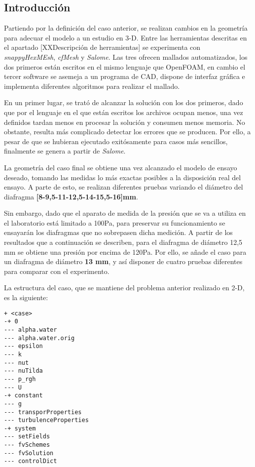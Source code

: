 \subsection{Introducción}\label{header-n2}

Partiendo por la definición del caso anterior, se realizan cambios en la
geometría para adecuar el modelo a un estudio en 3-D. Entre las
herramientas descritas en el apartado {[}XXDescripción de
herramientas{]} se experimenta con \emph{snappyHexMEsh}, \emph{cfMesh} y
\emph{Salome}. Las tres ofrecen mallados automatizados, los dos primeros
están escritos en el mismo lenguaje que OpenFOAM, en cambio el tercer
software se asemeja a un programa de CAD, dispone de interfaz gráfica e
implementa diferentes algoritmos para realizar el mallado.

En un primer lugar, se trató de alcanzar la solución con los dos
primeros, dado que por el lenguaje en el que están escritos los archivos
ocupan menos, una vez definidos tardan menos en procesar la solución y
consumen menos memoria. No obstante, resulta más complicado detectar los
errores que se producen. Por ello, a pesar de que se hubieran ejecutado
exitósamente para casos más sencillos, finalmente se genera a partir de
\emph{Salome}.

La geometría del caso final se obtiene una vez alcanzado el modelo de
ensayo deseado, tomando las medidas lo más exactas posibles a la
disposición real del ensayo. A parte de esto, se realizan diferentes
pruebas variando el diámetro del diafragma
\textbf{{[}8-9,5-11-12,5-14-15,5-16{]}mm}.

Sin embargo, dado que el aparato de medida de la presión que se va a
utiliza en el laboratorio está limitado a 100Pa, para preservar su
funcionamiento se ensayarán los diafragmas que no sobrepasen dicha
medición. A partir de los resultados que a continuación se describen,
para el diafragma de diámetro 12,5 mm se obtiene una presión por encima
de 120Pa. Por ello, se añade el caso para un diafragma de diámetro
\textbf{13 mm}, y así disponer de cuatro pruebas diferentes para
comparar con el experimento.

La estructura del caso, que se mantiene del problema anterior realizado
en 2-D, es la siguiente:

\begin{verbatim}
+ <case>
-+ 0
--- alpha.water
--- alpha.water.orig
--- epsilon
--- k
--- nut
--- nuTilda
--- p_rgh
--- U
-+ constant
--- g
--- transporProperties
--- turbulenceProperties
-+ system
--- setFields
--- fvSchemes
--- fvSolution
--- controlDict
\end{verbatim}

